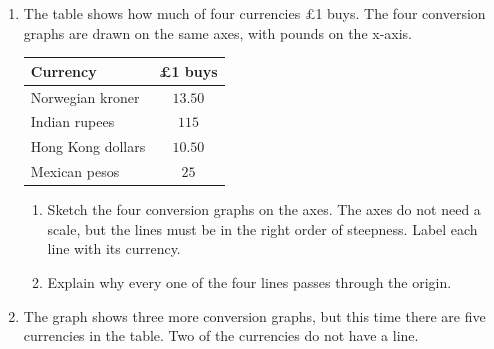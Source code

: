 \documentclass[12pt,a4paper]{article}
\begin{document}
\begin{enumerate}
\newpage

\item The table shows how much of four currencies \pounds1 buys. The four
conversion graphs are drawn on the same axes, with pounds on the x-axis.
\vspace{2pt}

\begin{minipage}[t]{0.42\linewidth}
\vspace{4pt}
\begin{tabular}{|l|c|}
\hline
\textbf{Currency} & \textbf{\pounds1 buys}\\
\hline
Norwegian kroner & $13.50$\\
\hline
Indian rupees & $115$\\
\hline
Hong Kong dollars & $10.50$\\
\hline
Mexican pesos & $25$\\
\hline
\end{tabular}
\end{minipage}%
\begin{minipage}[t]{0.58\linewidth}
\centering
{}
\end{minipage}

\begin{enumerate}
  \item Sketch the four conversion graphs on the axes. The axes do not need a
        scale, but the lines must be in the right order of steepness. Label
        each line with its currency.
  \item Explain why every one of the four lines passes through the origin.

        \vspace{8em}
\end{enumerate}

\newpage

\item The graph shows three more conversion graphs, but this time there are
five currencies in the table. Two of the currencies do not have a line.
\vspace{2pt}


\end{enumerate}
\end{document}
